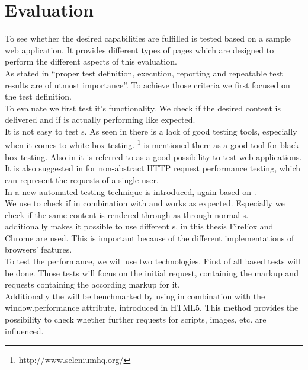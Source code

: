 \section{Evaluation\label{chap:evaluation}}
To see whether the desired capabilities are fulfilled \lare{} is tested based on a sample web application.
It provides different types of pages which are designed to perform the different aspects of this evaluation.
\\
As stated in \cite{palomaki2010web} \enquote{proper test definition, execution, reporting and repeatable test results are of utmost importance}.
To achieve those criteria we first focused on the test definition.
\\
To evaluate \lare{} we first test it's functionality.
We check if the desired content is delivered and if \lare{} is actually performing like expected.
\\
It is not easy to test \ajax{} \webApplication{}s.
As seen in \cite{marchetto2007testing} there is a lack of good testing tools, especially when it comes to white-box testing.
\selenium{}\footnote{http://www.seleniumhq.org/} is mentioned there as a good tool for black-box testing.
Also in \cite{lundmarkautomatic} it is referred to as a good possibility to test web applications.
It is also suggested in \cite{palomaki2010web} for non-abstract HTTP request performance testing, which can represent the requests of a single user.
\\
In \cite{marchetto2008state} a new automated testing technique is introduced, again based on \selenium{}.
\\
We use \selenium{} to check if \phpLare{} in combination with \twigLare{} and \lareJS{} works as expected.
Especially we check if the same content is rendered through \lare{} as through normal \httpRequest{}s.
\\
\selenium{} additionally makes it possible to use different \webdriver{}s, in this thesis FireFox and Chrome are used.
This is important because of the different implementations of browsers' features.
\\
To test the performance, we will use two technologies.
\cite{bozdag2008performance}
First of all \curl{} based tests will be done.
Those tests will focus on the initial request, containing the markup and \lare{} requests containing the according markup for it.
\\
Additionally the \webApplication{} will be benchmarked by using \selenium{} in combination with the window.performance attribute, introduced in HTML5.
This method provides the possibility to check whether further requests for scripts, images, etc. are influenced.
